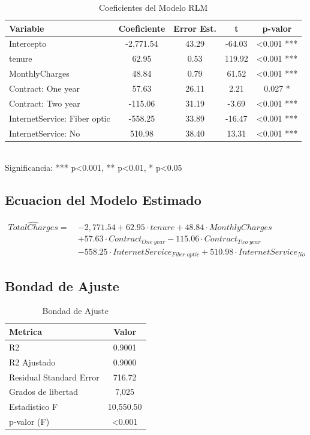 \documentclass[12pt,a4paper]{article}
\begin{document}
\begin{table}[H]
\centering
\caption{Coeficientes del Modelo RLM}
\begin{tabular}{lcccc}
\toprule
\textbf{Variable} & \textbf{Coeficiente} & \textbf{Error Est.} & \textbf{t} & \textbf{p-valor} \\
\midrule
Intercepto & -2,771.54 & 43.29 & -64.03 & \textless{}0.001 *** \\
tenure & 62.95 & 0.53 & 119.92 & \textless{}0.001 *** \\
MonthlyCharges & 48.84 & 0.79 & 61.52 & \textless{}0.001 *** \\
Contract: One year & 57.63 & 26.11 & 2.21 & 0.027 * \\
Contract: Two year & -115.06 & 31.19 & -3.69 & \textless{}0.001 *** \\
InternetService: Fiber optic & -558.25 & 33.89 & -16.47 & \textless{}0.001 *** \\
InternetService: No & 510.98 & 38.40 & 13.31 & \textless{}0.001 *** \\
\bottomrule
\end{tabular}
\\[0.3cm]
\small Significancia: *** p\textless{}0.001, ** p\textless{}0.01, * p\textless{}0.05
\end{table}

\subsection{Ecuacion del Modelo Estimado}

\begin{equation}
    \begin{aligned}
    \widehat{TotalCharges} = \ &-2,771.54 + 62.95 \cdot tenure + 48.84 \cdot MonthlyCharges \\
    & + 57.63 \cdot Contract_{One\ year} - 115.06 \cdot Contract_{Two\ year} \\
    & - 558.25 \cdot InternetService_{Fiber\ optic} + 510.98 \cdot InternetService_{No}
    \end{aligned}
\end{equation}

\subsection{Bondad de Ajuste}

\begin{table}[H]
\centering
\caption{Bondad de Ajuste}
\begin{tabular}{lc}
\toprule
\textbf{Metrica} & \textbf{Valor} \\
\midrule
R2 & 0.9001 \\
R2 Ajustado & 0.9000 \\
Residual Standard Error & 716.72 \\
Grados de libertad & 7,025 \\
Estadistico F & 10,550.50 \\
p-valor (F) & \textless{}0.001 \\
\bottomrule
\end{tabular}
\end{table}
\end{document}
